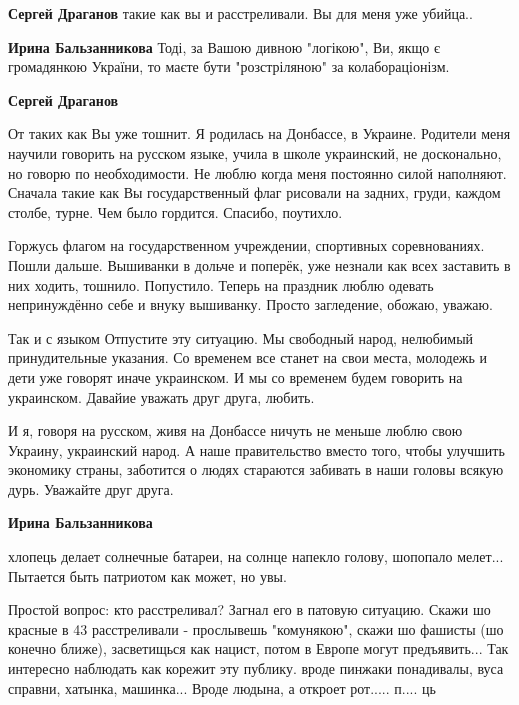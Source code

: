 \begin{itemize}
\begin{itemize}
\textbf{Сергей Драганов} такие как вы и расстреливали. Вы для меня уже убийца..


\textbf{Ирина Бальзанникова} Тоді, за Вашою дивною "логікою", Ви, якщо є
громадянкою України, то маєте бути "розстріляною" за колабораціонізм.


\textbf{Сергей Драганов} 

От таких как Вы уже тошнит. Я родилась на Донбассе, в
Украине. Родители меня научили говорить на русском языке, учила в школе
украинский, не досконально, но говорю по необходимости. Не люблю когда меня
постоянно силой наполняют. Сначала такие как Вы государственный флаг рисовали на
задних, груди, каждом столбе, турне. Чем было гордится. Спасибо, поутихло. 

Горжусь флагом на государственном учреждении, спортивных соревнованиях. Пошли
дальше. Вышиванки в дольче и поперёк, уже незнали как всех заставить в них
ходить, тошнило. Попустило. Теперь на праздник люблю одевать непринуждённо себе
и внуку вышиванку. Просто загледение, обожаю, уважаю. 

Так и с языком Отпустите эту
ситуацию. Мы свободный народ, нелюбимый принудительные указания. Со временем все
станет на свои места, молодежь и дети уже говорят иначе украинском. И мы со
временем будем говорить на украинском. Давайие уважать друг друга, любить. 

И я, говоря на русском, живя на Донбассе ничуть не меньше люблю свою Украину,
украинский народ. А наше правительство вместо того, чтобы улучшить экономику
страны, заботится о людях стараются забивать в наши головы всякую дурь.
Уважайте друг друга.



\textbf{Ирина Бальзанникова} 

хлопець делает солнечные батареи, на солнце
напекло голову, шопопало мелет... Пытается быть патриотом как может, но увы.

Простой вопрос: кто расстреливал? Загнал его в патовую ситуацию. Скажи шо
красные в 43 расстреливали - прослывешь "комунякою", скажи шо фашисты (шо
конечно ближе), засветищься как нацист, потом в Европе могут предъявить... Так
интересно наблюдать как корежит эту публику. вроде пинжаки понадивалы, вуса
справни, хатынка, машинка... Вроде людына, а откроет рот..... п.... ць
\end{itemize}


\end{itemize}

